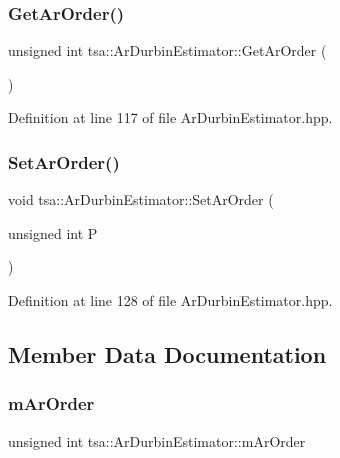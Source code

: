 \subsubsection{\texorpdfstring{Get\+Ar\+Order()}{GetArOrder()}}
{\footnotesize\ttfamily unsigned int tsa\+::\+Ar\+Durbin\+Estimator\+::\+Get\+Ar\+Order (\begin{DoxyParamCaption}{ }\end{DoxyParamCaption})\hspace{0.3cm}{\ttfamily [inline]}}



Definition at line 117 of file Ar\+Durbin\+Estimator.\+hpp.

\mbox{\label{classtsa_1_1_ar_durbin_estimator_af5cfeefd7e9a7bbd564373ead8d2a308}} 
\subsubsection{\texorpdfstring{Set\+Ar\+Order()}{SetArOrder()}}
{\footnotesize\ttfamily void tsa\+::\+Ar\+Durbin\+Estimator\+::\+Set\+Ar\+Order (\begin{DoxyParamCaption}\item[{unsigned int}]{P }\end{DoxyParamCaption})\hspace{0.3cm}{\ttfamily [inline]}}



Definition at line 128 of file Ar\+Durbin\+Estimator.\+hpp.



\subsection{Member Data Documentation}
\mbox{\label{classtsa_1_1_ar_durbin_estimator_a40783c942f77e9626e48eb1f8d7771ac}} 
\subsubsection{\texorpdfstring{m\+Ar\+Order}{mArOrder}}
{\footnotesize\ttfamily unsigned int tsa\+::\+Ar\+Durbin\+Estimator\+::m\+Ar\+Order\hspace{0.3cm}{\ttfamily [private]}}



